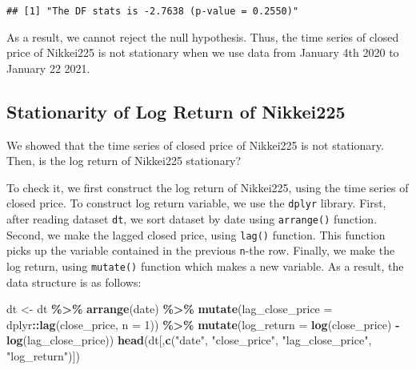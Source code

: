 \documentclass[
  12pt,
]{article}
\newenvironment{Shaded}{\begin{snugshade}}{\end{snugshade}}
\newcommand{\DataTypeTok}[1]{\textcolor[rgb]{0.13,0.29,0.53}{#1}}
\newcommand{\DecValTok}[1]{\textcolor[rgb]{0.00,0.00,0.81}{#1}}
\newcommand{\KeywordTok}[1]{\textcolor[rgb]{0.13,0.29,0.53}{\textbf{#1}}}
\newcommand{\NormalTok}[1]{#1}
\newcommand{\OperatorTok}[1]{\textcolor[rgb]{0.81,0.36,0.00}{\textbf{#1}}}
\newcommand{\StringTok}[1]{\textcolor[rgb]{0.31,0.60,0.02}{#1}}
\begin{document}
\begin{verbatim}
## [1] "The DF stats is -2.7638 (p-value = 0.2550)"
\end{verbatim}

As a result, we cannot reject the null hypothesis.
Thus, the time series of closed price of Nikkei225 is not stationary
when we use data from January 4th 2020 to January 22 2021.

\hypertarget{stationarity-of-log-return-of-nikkei225}{%
\subsection{Stationarity of Log Return of Nikkei225}\label{stationarity-of-log-return-of-nikkei225}}

We showed that the time series of closed price of Nikkei225 is not stationary.
Then, is the log return of Nikkei225 stationary?

To check it, we first construct the log return of Nikkei225, using the time series of closed price.
To construct log return variable, we use the \texttt{dplyr} library.
First, after reading dataset \texttt{dt}, we sort dataset by date using \texttt{arrange()} function.
Second, we make the lagged closed price, using \texttt{lag()} function.
This function picks up the variable contained in the previous \texttt{n}-the row.
Finally, we make the log return, using \texttt{mutate()} function which makes a new variable.
As a result, the data structure is as follows:

\begin{Shaded}
\begin{Highlighting}[]
\NormalTok{dt \textless{}{-}}\StringTok{ }\NormalTok{dt }\OperatorTok{\%\textgreater{}\%}\StringTok{ }
\StringTok{  }\KeywordTok{arrange}\NormalTok{(date) }\OperatorTok{\%\textgreater{}\%}\StringTok{ }
\StringTok{  }\KeywordTok{mutate}\NormalTok{(}\DataTypeTok{lag\_close\_price =}\NormalTok{ dplyr}\OperatorTok{::}\KeywordTok{lag}\NormalTok{(close\_price, }\DataTypeTok{n =} \DecValTok{1}\NormalTok{)) }\OperatorTok{\%\textgreater{}\%}\StringTok{ }
\StringTok{  }\KeywordTok{mutate}\NormalTok{(}\DataTypeTok{log\_return =} \KeywordTok{log}\NormalTok{(close\_price) }\OperatorTok{{-}}\StringTok{ }\KeywordTok{log}\NormalTok{(lag\_close\_price))}
\KeywordTok{head}\NormalTok{(dt[,}\KeywordTok{c}\NormalTok{(}\StringTok{"date"}\NormalTok{, }\StringTok{"close\_price"}\NormalTok{, }\StringTok{"lag\_close\_price"}\NormalTok{, }\StringTok{"log\_return"}\NormalTok{)])}
\end{Highlighting}
\end{Shaded}
\end{document}

